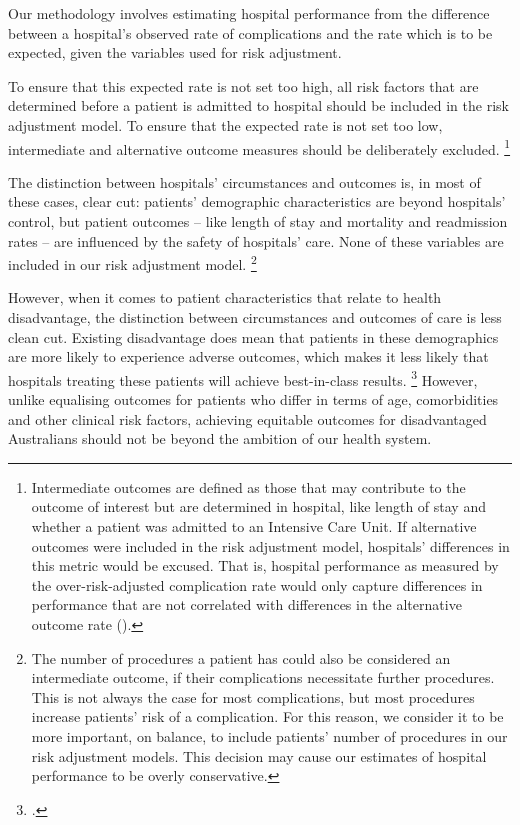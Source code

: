 \documentclass[submission]{grattan}
\begin{document}
Our methodology involves estimating hospital performance from the difference between a hospital's observed rate of complications and the rate which is to be expected, given the variables used for risk adjustment.

To ensure that this expected rate is not set too high, all risk factors that are determined before a patient is admitted to hospital should be included in the risk adjustment model.
To ensure that the expected rate is not set too low, intermediate and alternative outcome measures should be deliberately excluded.%
	\footnote{Intermediate outcomes are defined as those that may contribute to the outcome of interest but are determined in hospital, like length of stay and whether a patient was admitted to an Intensive Care Unit.
	If alternative outcomes were included in the risk adjustment model, hospitals' differences in this metric would be excused.
	That is, hospital performance as measured by the over-risk-adjusted complication rate would only capture differences in performance that are not correlated with differences in the alternative outcome rate (\textcite[][19]{Ash-etal-2012-Stats-issues-assessing-hospital-perf}).}

The distinction between hospitals' circumstances and outcomes is, in most of these cases, clear cut: patients' demographic characteristics are beyond hospitals' control, but patient outcomes -- like length of stay and mortality and readmission rates -- are influenced by the safety of hospitals' care.
None of these variables are included in our risk adjustment model.%
	\footnote{The number of procedures a patient has could also be considered an intermediate outcome, if their complications necessitate further procedures.
	This is not always the case for most complications, but most procedures increase patients' risk of a complication.
	For this reason, we consider it to be more important, on balance, to include patients' number of procedures in our risk adjustment models.
	This decision may cause our estimates of hospital performance to be overly conservative.}

However, when it comes to patient characteristics that relate to health disadvantage, the distinction between circumstances and outcomes of care is less clean cut.
Existing disadvantage does mean that patients in these demographics are more likely to experience adverse outcomes, which makes it less likely that hospitals treating these patients will achieve best-in-class results.%
	\footcites{Iezzoni-2012-Risk-Adjustment-for-Measuring-Health-Care-Outcomes}{krumholz2006standards}
However, unlike equalising outcomes for patients who differ in terms of age, comorbidities and other clinical risk factors, achieving equitable outcomes for disadvantaged Australians should not be beyond the ambition of our health system.
\end{document}
